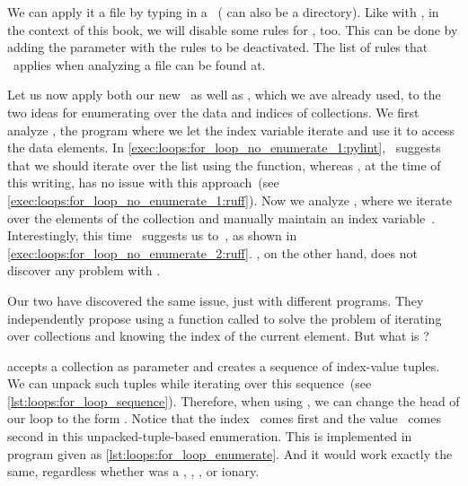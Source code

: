 We can apply it a file  by typing  in a ~( can also be a directory).
Like with \ruff, in the context of this book, we will disable some  rules for \pylint, too.
This can be done by adding the parameter  with the rules to be deactivated.
The list of rules that \pylint\ applies when analyzing a file can be found at.%
%
\begin{sloppypar}%
Let us now apply both our new  \pylint\ as well as \ruff, which we ave already used, to the two ideas for enumerating over the data and indices of collections.
We first analyze , the program where we let the index variable iterate and use it to access the data elements.
In \cref{exec:loops:for_loop_no_enumerate_1:pylint}, \pylint\ suggests that we should iterate over the list  using the  function, whereas \ruff, at the time of this writing, has no issue with this approach~(see \cref{exec:loops:for_loop_no_enumerate_1:ruff}).
Now we analyze , where we iterate over the elements of the collection and manually maintain an index variable~.
Interestingly, this time \ruff\ suggests us to~, as shown in \cref{exec:loops:for_loop_no_enumerate_2:ruff}.
\pylint, on the other hand, does not discover any problem with .%
\end{sloppypar}%
%
Our two  have discovered the same issue, just with different programs.
They independently propose using a function called  to solve the problem of iterating over collections and knowing the index of the current element.
But what is ?

 accepts a collection as parameter and creates a sequence of index-value tuples.
We can unpack such tuples while iterating over this sequence~(see \cref{lst:loops:for_loop_sequence}).
Therefore, when using , we can change the head of our loop to the form .
Notice that the index~ comes first and the value~ comes second in this unpacked-tuple-based enumeration.
This is implemented in program  given as \cref{lst:loops:for_loop_enumerate}.
And it would work exactly the same, regardless whether  was a , , , or ionary.

